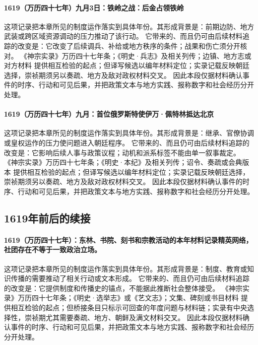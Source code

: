 \paragraph{1619（万历四十七年）九月3日：铁岭之战：后金占领铁岭} 这项记录把本章所见的制度运作落实到具体年份。其形成背景是：前期边防、地方武装或跨区域资源调动的压力推动了该行动。 它带来的、而且仍可由后续材料追踪的改变是：它改变了后续调兵、补给或地方秩序的条件；战果和伤亡须分开核对。 《神宗实录》万历四十七年条；《明史·兵志》及相关列传；边镇、地方志或对方材料 提供相互检验的起点；但译写候选以编年材料定位；实录记载反映朝廷选择，崇祯期须另以奏疏、地方及敌对政权材料交叉。 因此本段仅据材料确认事件的时序、行动和可见后果，并把政策文本与地方实践、报称数字和社会经历分开处理。

\paragraph{1619（万历四十七年）九月：首位俄罗斯特使伊万·佩特林抵达北京} 这项记录把本章所见的制度运作落实到具体年份。其形成背景是：继承、官僚协调或皇权运作的压力使问题进入朝廷程序。 它带来的、而且仍可由后续材料追踪的改变是：它影响后续人事与政策议程；动机和派系标签不能由单一叙事裁定。 《神宗实录》万历四十七年条；《明史·本纪》及相关列传；诏令、奏疏或会典版本 提供相互检验的起点；但译写候选以编年材料定位；实录记载反映朝廷选择，崇祯期须另以奏疏、地方及敌对政权材料交叉。 因此本段仅据材料确认事件的时序、行动和可见后果，并把政策文本与地方实践、报称数字和社会经历分开处理。

\subsection{1619年前后的续接}

\paragraph{1619（万历四十七年）：东林、书院、刻书和宗教活动的本年材料记录精英网络，社团存在不等于一致政治立场。} 这项记录把本章所见的制度运作落实到具体年份。其形成背景是：制度、教育或知识传播的需要推动了相关行动或文本形成。 它带来的、而且仍可由后续材料追踪的改变是：它提供制度和传播史的锚点，不能据此推断社会整体接受。 《神宗实录》万历四十七年条；《明史·选举志》或《艺文志》；文集、碑刻或书目材料 提供相互检验的起点；但桥接条目只标示可回查的年度问题与材料链；实录有中央选择性，崇祯期尤其需要奏疏、地方、朝鲜及满文材料交叉。 因此本段仅据材料确认事件的时序、行动和可见后果，并把政策文本与地方实践、报称数字和社会经历分开处理。

